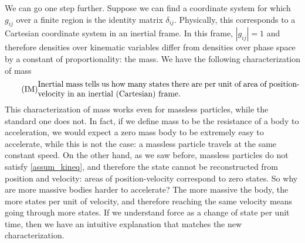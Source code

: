 We can go one step further. Suppose we can find a coordinate system for which $g_{ij}$ over a finite region is the identity matrix $\delta_{ij}$. Physically, this corresponds to a Cartesian coordinate system in an inertial frame. In this frame, $|g_{ij}| = 1$ and therefore densities over kinematic variables differ from densities over phase space by a constant of proportionality: the mass. We have the following characterization of mass
\begin{equation}
	\tag{IM}
	\eqtext{Inertial mass tells us how many states there are per unit of area of position-velocity in an inertial (Cartesian) frame.}
\end{equation}
This characterization of mass works even for massless particles, while the standard one does not. In fact, if we define mass to be the resistance of a body to acceleration, we would expect a zero mass body to be extremely easy to accelerate, while this is not the case: a massless particle travels at the same constant speed. On the other hand, as we saw before, massless particles do not satisfy \ref{assum_kineq}, and therefore the state cannot be reconstructed from position and velocity: areas of position-velocity correspond to zero states. So why are more massive bodies harder to accelerate? The more massive the body, the more states per unit of velocity, and therefore reaching the same velocity means going through more states. If we understand force as a change of state per unit time, then we have an intuitive explanation that matches the new characterization.


